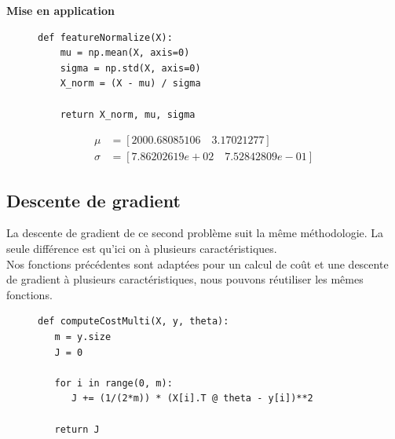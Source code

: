 \clearpage

\vspace{.5cm}
\noindent
\textbf{Mise en application}
\vspace{.2cm}


\begin{figure}[!h]
    \begin{minipage}{.48\linewidth}
\begin{verbatim}
def featureNormalize(X):
    mu = np.mean(X, axis=0)
    sigma = np.std(X, axis=0)
    X_norm = (X - mu) / sigma

    return X_norm, mu, sigma
\end{verbatim}   
    \end{minipage}\hfill
    \begin{minipage}{.48\linewidth}
        \begin{equation*}
            \begin{aligned}
                \mu &= [2000.68085106 \quad 3.17021277] \\
                \sigma &= [7.86202619e+02 \quad 7.52842809e-01]
            \end{aligned}
        \end{equation*}  
    \end{minipage}
\end{figure}



\subsection{Descente de gradient}

La descente de gradient de ce second problème suit la même méthodologie. La seule différence est qu'ici on à plusieurs caractéristiques. \\
Nos fonctions précédentes sont adaptées pour un calcul de coût et une descente de gradient à plusieurs caractéristiques, nous pouvons réutiliser les mêmes fonctions.

\begin{figure}[!h]
\begin{verbatim}
def computeCostMulti(X, y, theta):  
   m = y.size
   J = 0

   for i in range(0, m):
      J += (1/(2*m)) * (X[i].T @ theta - y[i])**2
   
   return J
\end{verbatim}   
\label{listing:computeCostMulti}
\end{figure}


